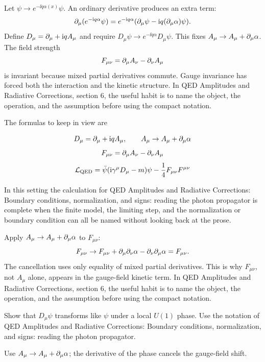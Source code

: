 Let \(\psi\to e^{-\ii q\alpha(x)}\psi\).  An ordinary derivative produces an extra term:
\[
  \partial_\mu(e^{-\mathrm i q\alpha}\psi)
  =
  e^{-\mathrm i q\alpha}(\partial_\mu\psi-\mathrm i q(\partial_\mu\alpha)\psi).
\]
Define \(D_\mu=\partial_\mu+\mathrm i qA_\mu\) and require \(D_\mu\psi\to e^{-\ii q\alpha}D_\mu\psi\).  This fixes \(A_\mu\to A_\mu+\partial_\mu\alpha\).  The field strength
\[
  F_{\mu\nu}=\partial_\mu A_\nu-\partial_\nu A_\mu
\]
is invariant because mixed partial derivatives commute.  Gauge invariance has forced both the interaction and the kinetic structure.  In QED Amplitudes and Radiative Corrections, section 6, the useful habit is to name the object, the operation, and the assumption before using the compact notation.

The formulas to keep in view are

\[
  D_\mu=\partial_\mu+\mathrm i qA_\mu,\qquad A_\mu\to A_\mu+\partial_\mu\alpha
\]
\[
  F_{\mu\nu}=\partial_\mu A_\nu-\partial_\nu A_\mu
\]
\[
  \mathcal L_{\mathrm{QED}}=\bar\psi(\mathrm i\gamma^\mu D_\mu-m)\psi-\frac14F_{\mu\nu}F^{\mu\nu}
\]

In this setting the calculation for QED Amplitudes and Radiative Corrections: Boundary conditions, normalization, and signs: reading the photon propagator is complete when the finite model, the limiting step, and the normalization or boundary condition can all be named without looking back at the prose.




\begin{example}
Apply \(A_\mu\to A_\mu+\partial_\mu\alpha\) to \(F_{\mu\nu}\):
\[
  F_{\mu\nu}\to F_{\mu\nu}+\partial_\mu\partial_\nu\alpha-\partial_\nu\partial_\mu\alpha=F_{\mu\nu}.
\]
The cancellation uses only equality of mixed partial derivatives.  This is why \(F_{\mu\nu}\), not \(A_\mu\) alone, appears in the gauge-field kinetic term.  In QED Amplitudes and Radiative Corrections, section 6, the useful habit is to name the object, the operation, and the assumption before using the compact notation.
\end{example}



\begin{exercise}
Show that \(D_\mu\psi\) transforms like \(\psi\) under a local \(U(1)\) phase.  Use the notation of QED Amplitudes and Radiative Corrections: Boundary conditions, normalization, and signs: reading the photon propagator.
\begin{answer}
Use \(A_\mu\to A_\mu+\partial_\mu\alpha\); the derivative of the phase cancels the gauge-field shift.
\end{answer}
\end{exercise}

